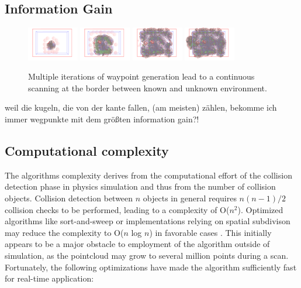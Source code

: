 \documentclass[a4paper, 10pt, conference]{ieeeconf}        %
\begin{document}


\subsection{Information Gain}

\begin{figure}[ht]
  \centering
    \includegraphics[width=0.2\textwidth]{images/process1}
    \includegraphics[width=0.2\textwidth]{images/process2}
    \includegraphics[width=0.2\textwidth]{images/process3}
    \includegraphics[width=0.2\textwidth]{images/process4}
    \caption{Multiple iterations of waypoint generation lead to a continuous scanning at the border between known and unknown environment.}
\end{figure}

weil die kugeln, die von der kante fallen, (am meisten) zählen, bekomme ich immer wegpunkte mit dem größten information gain?!

\subsection{Computational complexity}

The algorithms complexity derives from the computational effort of the collision detection phase in physics simulation and thus from the number of collision objects. Collision detection between $n$ objects in general requires $n(n-1)/2$ collision checks to be performed, leading to a complexity of O($n^2$). Optimized algorithms like sort-and-sweep or implementations relying on spatial subdivison may reduce the complexity to O($n$ log $n$) in favorable cases \cite{legrand2007}. This initially appears to be a major obstacle to employment of the algorithm outside of simulation, as the pointcloud may grow to several million points during a scan. Fortunately, the following optimizations have made the algorithm sufficiently fast for real-time application:
\end{document}
